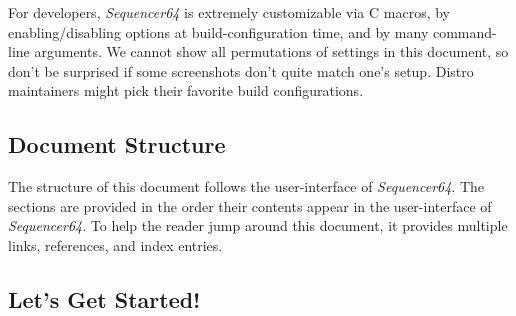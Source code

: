 \documentclass[
 11pt,
 twoside,
 a4paper,
 headinclude,
 footinclude,
 final                                 %
]{article}
\begin{document}

   For developers, \textsl{Sequencer64} is extremely customizable via C macros,
   by enabling/disabling options at build-configuration time, and by many
   command-line arguments.  We cannot show all permutations of settings in this
   document, so don't be surprised if some screenshots don't quite match
   one's setup.  Distro maintainers might pick their favorite build
   configurations.

\subsection{Document Structure}
\label{subsec:introduction_document_structure}

   The structure of this document follows the user-interface of
   \textsl{Sequencer64}.  The sections are provided in the order
   their contents appear in the user-interface of \textsl{Sequencer64}.  To
   help the reader jump around this document, it provides
   multiple links, references, and index entries.

%
%
%

\subsection{Let's Get Started!}
\label{subsec:introduction_lets_get_started}
\end{document}
